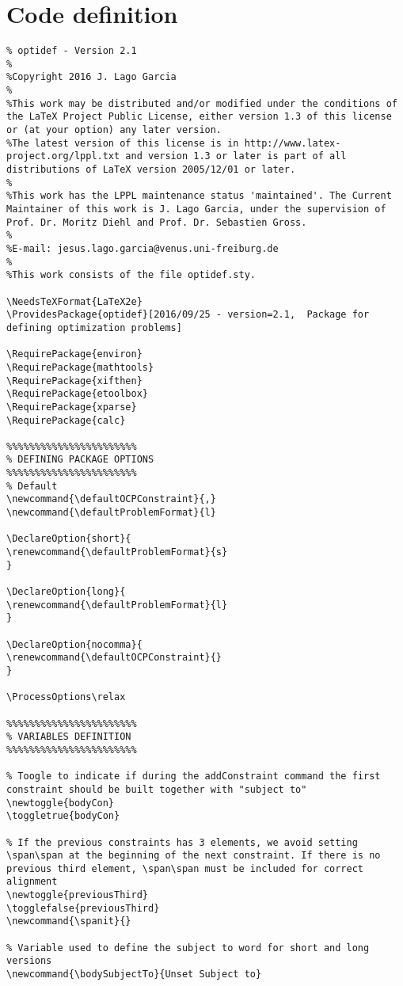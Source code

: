 \documentclass[a4paper]{article}
\begin{document}
\section{Code definition}
\begin{lstlisting}
% optidef - Version 2.1
%
%Copyright 2016 J. Lago Garcia
%
%This work may be distributed and/or modified under the conditions of the LaTeX Project Public License, either version 1.3 of this license or (at your option) any later version.
%The latest version of this license is in http://www.latex-project.org/lppl.txt and version 1.3 or later is part of all distributions of LaTeX version 2005/12/01 or later.
%
%This work has the LPPL maintenance status 'maintained'. The Current Maintainer of this work is J. Lago Garcia, under the supervision of Prof. Dr. Moritz Diehl and Prof. Dr. Sebastien Gross.
%
%E-mail: jesus.lago.garcia@venus.uni-freiburg.de
%
%This work consists of the file optidef.sty.

\NeedsTeXFormat{LaTeX2e}
\ProvidesPackage{optidef}[2016/09/25 - version=2.1,  Package for defining optimization problems]

\RequirePackage{environ}
\RequirePackage{mathtools}	
\RequirePackage{xifthen}
\RequirePackage{etoolbox}	
\RequirePackage{xparse}	
\RequirePackage{calc}	

%%%%%%%%%%%%%%%%%%%%%%%
% DEFINING PACKAGE OPTIONS
%%%%%%%%%%%%%%%%%%%%%%%
% Default
\newcommand{\defaultOCPConstraint}{,}
\newcommand{\defaultProblemFormat}{l}

\DeclareOption{short}{
\renewcommand{\defaultProblemFormat}{s}
}

\DeclareOption{long}{
\renewcommand{\defaultProblemFormat}{l}
}

\DeclareOption{nocomma}{
\renewcommand{\defaultOCPConstraint}{}
}

\ProcessOptions\relax

%%%%%%%%%%%%%%%%%%%%%%%
% VARIABLES DEFINITION
%%%%%%%%%%%%%%%%%%%%%%%

% Toogle to indicate if during the addConstraint command the first constraint should be built together with "subject to"
\newtoggle{bodyCon}
\toggletrue{bodyCon}

% If the previous constraints has 3 elements, we avoid setting \span\span at the beginning of the next constraint. If there is no previous third element, \span\span must be included for correct alignment
\newtoggle{previousThird}
\togglefalse{previousThird}
\newcommand{\spanit}{}

% Variable used to define the subject to word for short and long versions
\newcommand{\bodySubjectTo}{Unset Subject to}


\end{lstlisting}
\end{document}
